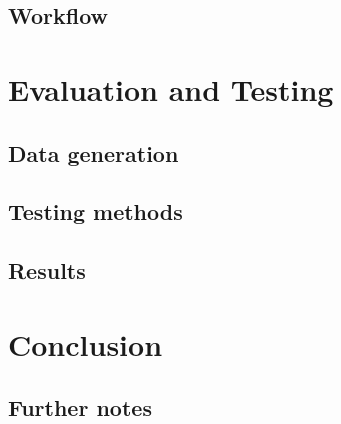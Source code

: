 \documentclass[11pt,a4paper]{vutinfth}
\begin{document}
\section{Workflow}%







\chapter{Evaluation and Testing}

\section{Data generation} %

\section{Testing methods}

\section{Results}

\chapter{Conclusion}

\section{Further notes}





\backmatter %



\end{document}

